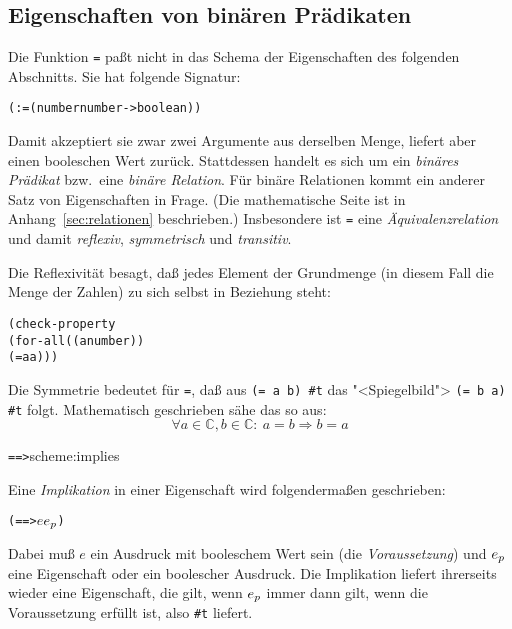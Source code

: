 \subsection{Eigenschaften von binären Prädikaten}

Die Funktion \texttt{=} paßt nicht in das Schema der Eigenschaften
des folgenden Abschnitts.  Sie hat folgende Signatur:
%
\begin{alltt}
(: = (number number -> boolean))
\end{alltt}
%
Damit akzeptiert sie zwar zwei Argumente aus derselben Menge, liefert
aber einen booleschen Wert zurück.  Stattdessen handelt es sich um ein
\textit{binäres Prädikat} bzw.\ eine \textit{binäre
  Relation}.  Für binäre
Relationen kommt ein anderer Satz von Eigenschaften in Frage.  (Die
mathematische Seite ist in Anhang~\ref{sec:relationen} beschrieben.)
Insbesondere ist \texttt{=} eine
\textit{Äquivalenzrelation} und damit
\textit{reflexiv},
\textit{symmetrisch} und
\textit{transitiv}.

Die Reflexivität besagt, daß jedes Element der Grundmenge (in diesem
Fall die Menge der Zahlen) zu sich selbst in Beziehung steht:
%
\begin{alltt}
(check-property
 (for-all ((a number))
   (= a a)))
\end{alltt}
%
Die Symmetrie bedeutet für \texttt{=}, daß aus \texttt{(= a b)
  \evalsto{} \#t} das "<Spiegelbild"> \texttt{(= b a) \evalsto{} \#t}
folgt.  Mathematisch geschrieben sähe das so aus:
%
\begin{displaymath}
  \forall a \in \mathbb{C}, b\in\mathbb{C}:\ a = b \Rightarrow b = a
\end{displaymath}
%
\begin{feature}{\texttt{==>}}{scheme:implies}

Eine \textit{Implikation} in einer Eigenschaft wird
folgendermaßen geschrieben:
\begin{alltt}
(==> \(e\) \(e\sb{p}\))
\end{alltt}
%
Dabei muß $e$ ein Ausdruck mit booleschem Wert sein (die
\textit{Voraussetzung}) und \(e\sb{p}\) eine Eigenschaft oder ein
boolescher Ausdruck.  Die Implikation liefert ihrerseits wieder eine
Eigenschaft, die gilt, wenn \(e\sb{p}\) immer dann gilt, wenn die
Voraussetzung erfüllt ist, also \verb|#t| liefert.
\end{feature}

